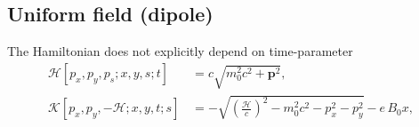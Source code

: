 \documentclass[]{article}
\begin{document}
\newpage
\subsection{Uniform field (dipole)}

The Hamiltonian does not explicitly depend on time-parameter
\begin{subequations}
\begin{align}
	\mathcal{H}[p_x,p_y,p_s;x,y,s;t]\quad\!\! &=
	c \sqrt{ m_0^2c^2 + \mathbf{p}^2 },										\\
	\mathcal{K}[p_x,p_y,-\mathcal{H};x,y,t;s] &=
	- \sqrt{ \left(\frac{\mathcal{H}}{c}\right)^2 - m_0^2c^2 - p_x^2 - p_y^2 }
	- e\,B_0 x,
\end{align}
\end{subequations}
\end{document}
